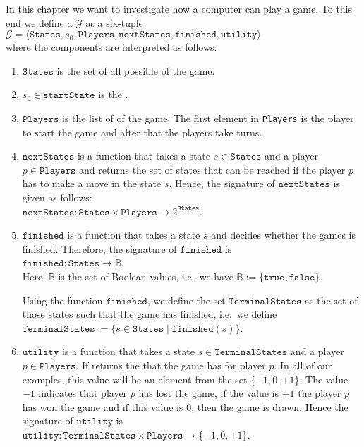 In this chapter we want to investigate how a computer can play a game.  To this end we define a
 $\mathcal{G}$ as a six-tuple
\\[0.2cm]
\hspace*{1.3cm}
$\mathcal{G} = \langle \texttt{States}, s_0, \texttt{Players}, \texttt{nextStates}, \texttt{finished},\texttt{utility} \rangle$
\\[0.2cm]
where the components are interpreted as follows:
\begin{enumerate}
\item $\texttt{States}$ is the set of all possible  of the game.
\item $s_0 \in \texttt{startState}$ is the .
\item $\texttt{Players}$ is  the list of  of the game.  The first element in \texttt{Players} is
      the player to start the game and after that the players take turns.
\item $\texttt{nextStates}$ is a function that takes a state $s \in \texttt{States}$ and a player $p \in \texttt{Players}$ and returns the set of
      states that can be reached if the player $p$ has to make a move in the state $s$.  Hence, the signature of
      $\texttt{nextStates}$ is given as follows:
      \\[0.2cm]
      \hspace*{1.3cm}
      $\texttt{nextStates}: \texttt{States} \times \texttt{Players} \rightarrow 2^{\texttt{States}}$.
\item $\texttt{finished}$ is a function that takes a state $s$ and decides whether the games is finished.
      Therefore, the signature of $\texttt{finished}$ is
      \\[0.2cm]
      \hspace*{1.3cm}
      $\texttt{finished}: \texttt{States} \rightarrow \mathbb{B}$.
      \\[0.2cm]
      Here, $\mathbb{B}$ is the set of Boolean values, i.e.~we have $\mathbb{B} := \{ \texttt{true}, \texttt{false} \}$.
  
      Using the function $\texttt{finished}$, we define the set $\texttt{TerminalStates}$ as the set of those
      states such that the game has finished,  i.e.~we define
      \\[0.2cm]
      \hspace*{1.3cm}
      $\texttt{TerminalStates} := \{ s \in \texttt{States} \mid \texttt{finished}(s) \}$.
\item $\texttt{utility}$ is a function that takes a state $s \in \texttt{TerminalStates}$ and a player $p \in \texttt{Players}$.  If returns
      the  that the game has for player $p$.  In all of our examples, this value will be an element
      from the set $\{-1, 0, +1\}$.  The value $-1$ indicates that player $p$ has lost the game,
      if the value is $+1$ the player $p$ has won the game and if this value is $0$, then the game is drawn.
      Hence the signature of $\texttt{utility}$ is
      \\[0.2cm]
      \hspace*{1.3cm}
      $\texttt{utility}: \texttt{TerminalStates} \times \texttt{Players} \rightarrow \{ -1, 0, +1\}$.
\end{enumerate}


